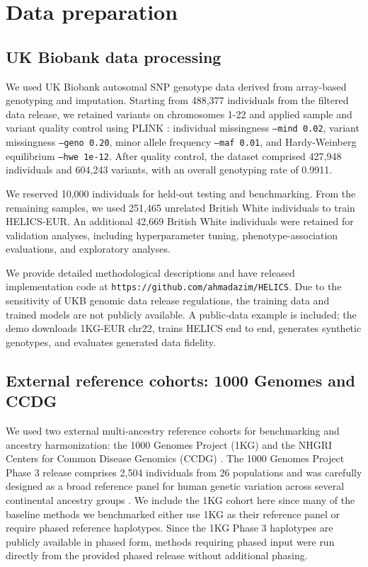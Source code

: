 \documentclass{article}
\begin{document}
\section{Data preparation}
\label{app:data-prep} 
\subsection{UK Biobank data processing}
\label{app:UKB}

We used UK Biobank autosomal SNP genotype data derived from array-based genotyping and imputation. Starting from 488,377 individuals from the filtered data release, we retained variants on chromosomes 1-22 and applied sample and variant quality control using PLINK \cite{chang2015second}: individual missingness \texttt{---mind 0.02}, variant missingness \texttt{---geno 0.20}, minor allele frequency \texttt{---maf 0.01}, and Hardy-Weinberg equilibrium \texttt{---hwe 1e-12}. After quality control, the dataset comprised 427,948 individuals and 604,243 variants, with an overall genotyping rate of 0.9911.

We reserved 10,000 individuals for held-out testing and benchmarking. From the remaining samples, we used 251,465 unrelated British White individuals to train HELICS-EUR. An additional 42,669 British White individuals were retained for validation analyses, including hyperparameter tuning, phenotype-association evaluations, and exploratory analyses. 

We provide detailed methodological descriptions and have released implementation code at \texttt{https://github.com/ahmadazim/HELICS}. Due to the sensitivity of UKB genomic data release regulations, the training data and trained models are not publicly available. A public-data example is included; the demo downloads 1KG-EUR chr22, trains HELICS end to end, generates synthetic genotypes, and evaluates generated data fidelity. 


\subsection{External reference cohorts: 1000 Genomes and CCDG}

We used two external multi-ancestry reference cohorts for benchmarking and ancestry harmonization: the 1000 Genomes Project (1KG) \cite{auton2015global} and the NHGRI Centers for Common Disease Genomics (CCDG) \cite{regier2018functional}. The 1000 Genomes Project Phase 3 release comprises 2,504 individuals from 26 populations and was carefully designed as a broad reference panel for human genetic variation across several continental ancestry groups \cite{auton2015global}. We include the 1KG cohort here since many of the baseline methods we benchmarked either use 1KG as their reference panel or require phased reference haplotypes. Since the 1KG Phase 3 haplotypes are publicly available in phased form, methods requiring phased input were run directly from the provided phased release without additional phasing.
\end{document}
